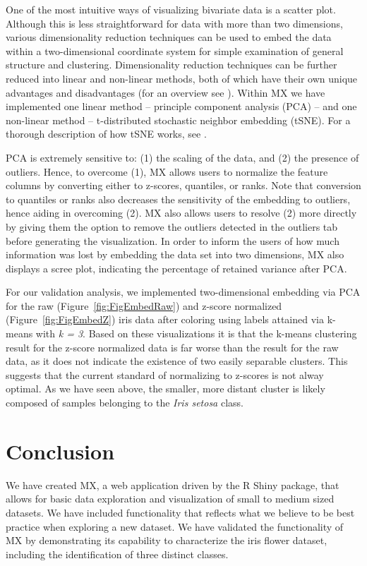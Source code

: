 \documentclass{article}
\begin{document}
One of the most intuitive ways of visualizing bivariate data is a scatter plot. Although this is less straightforward for data with more than two dimensions, various dimensionality reduction techniques can be used to embed the data within a two-dimensional coordinate system for simple examination of general structure and clustering. Dimensionality reduction techniques can be further reduced into linear and non-linear methods, both of which have their own unique advantages and disadvantages (for an overview see \cite{van2009dimensionality}). Within MX we have implemented one linear method -- principle component analysis (PCA) -- and one non-linear method -- t-distributed stochastic neighbor embedding (tSNE). For a thorough description of how tSNE works, see \cite{van2008visualizing}.

PCA is extremely sensitive to: (1) the scaling of the data, and (2) the presence of outliers.  Hence, to overcome (1), MX allows users to normalize the feature columns by converting either to z-scores, quantiles, or ranks. Note that conversion to quantiles or ranks also decreases the sensitivity of the embedding to outliers, hence aiding in overcoming (2). MX also allows users to resolve (2) more directly by giving them the option to remove the outliers detected in the outliers tab before generating the visualization. In order to inform the users of how much information was lost by embedding the data set into two dimensions, MX also displays a scree plot, indicating the percentage of retained variance after PCA. 

For our validation analysis, we implemented two-dimensional embedding via PCA for the raw (Figure~\ref{fig:FigEmbedRaw})  and z-score normalized (Figure~\ref{fig:FigEmbedZ}) iris data after coloring using labels attained via k-means with \textit{k = 3}. Based on these visualizations it is that the k-means clustering result for the z-score normalized data is far worse than the result for the raw data, as it does not indicate the existence of two easily separable clusters. This suggests that the current standard of  normalizing to z-scores is not alway optimal. As we have seen above, the smaller, more distant cluster is likely composed of samples belonging to the \textit{Iris setosa} class.

\section{Conclusion}
\label{sec:conc}

We have created MX, a web application driven by the R Shiny package, that allows for basic data exploration and visualization of small to medium sized datasets. We have included functionality that reflects what we believe to be best practice when exploring a new dataset. We have validated the functionality of MX by demonstrating its capability to characterize the iris flower dataset, including the identification of three distinct classes.
\end{document}

